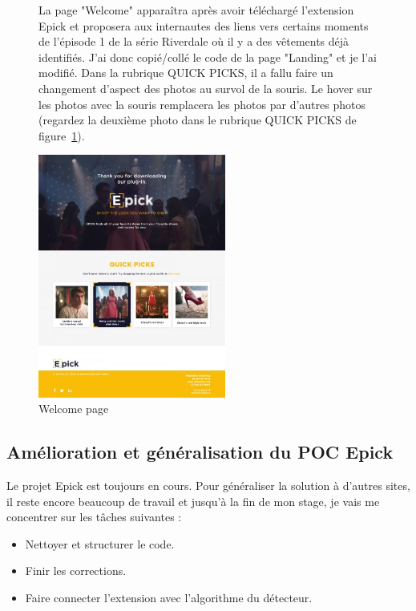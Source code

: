 \documentclass[a4paper, 12pt]{report}
\begin{document}
\begin{figure}[!htbp]
\begin{minipage}{0.46\linewidth}
La page "Welcome" apparaîtra après avoir téléchargé l'extension Epick et proposera aux internautes des liens vers certains moments de l’épisode 1 de la série Riverdale où il y a des vêtements déjà identifiés. J'ai donc copié/collé le code de la page "Landing" et je l'ai modifié.
Dans la rubrique QUICK PICKS, il a fallu faire un changement d'aspect des photos au survol de la souris. Le hover sur les photos avec la souris remplacera les photos par d'autres photos (regardez la deuxième photo dans le rubrique QUICK PICKS de figure~\ref{fig:4.6}).

\end{minipage}\hfil
\begin{minipage}{0.35\linewidth}
    \includegraphics[height=8cm]{images/Epick_Welcome_page_preview.jpg}
    \caption{Welcome page}
 \label{fig:4.6}
\end{minipage}
\end{figure}
\newpage
\subsection{Amélioration et généralisation du POC Epick }
Le projet Epick est toujours en cours. Pour généraliser la solution à d'autres sites, il reste encore beaucoup de travail et jusqu'à la fin de mon stage, je vais me concentrer sur les tâches suivantes :
\begin{itemize}
\item \textbf{}Nettoyer et structurer le code.
\item \textbf{}Finir les corrections.
\item \textbf{}Faire connecter l'extension avec l'algorithme du détecteur.
\end{itemize} 
\newpage
\end{document}
